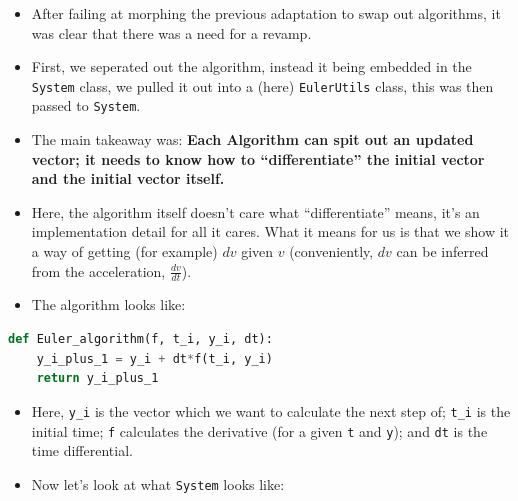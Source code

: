 \documentclass[11pt]{article}
\begin{document}
    \begin{itemize}
        \item After failing at morphing the previous adaptation to swap out algorithms, it was clear that there was a need for a revamp.
        \item First, we seperated out the algorithm, instead it being embedded in the \texttt{System} class, we pulled it out into a (here) \texttt{EulerUtils} class, this was then passed to \texttt{System}.
        \item The main takeaway was: \textbf{Each Algorithm can spit out an updated vector; it needs to know how to ``differentiate'' the initial vector and the initial vector itself.}
        \item Here, the algorithm itself doesn't care what ``differentiate'' means, it's an implementation detail for all it cares. What it means for us is that we show it a way of getting (for example) $dv$ given $v$ (conveniently, $dv$ can be inferred from the acceleration, $\frac{dv}{dt}$).
        \item The algorithm looks like:
    \end{itemize}
    \begin{lstlisting}[language=Python, caption=Euler's method]
def Euler_algorithm(f, t_i, y_i, dt):
    y_i_plus_1 = y_i + dt*f(t_i, y_i)
    return y_i_plus_1
    \end{lstlisting}
    \begin{itemize}
        \item Here, \texttt{y\_i} is the vector which we want to calculate the next step of; \texttt{t\_i} is the initial time; \texttt{f} calculates the derivative (for a given \texttt{t} and \texttt{y}); and \texttt{dt} is the time differential.
        \item Now let's look at what \texttt{System} looks like:
    \end{itemize}
\end{document}
